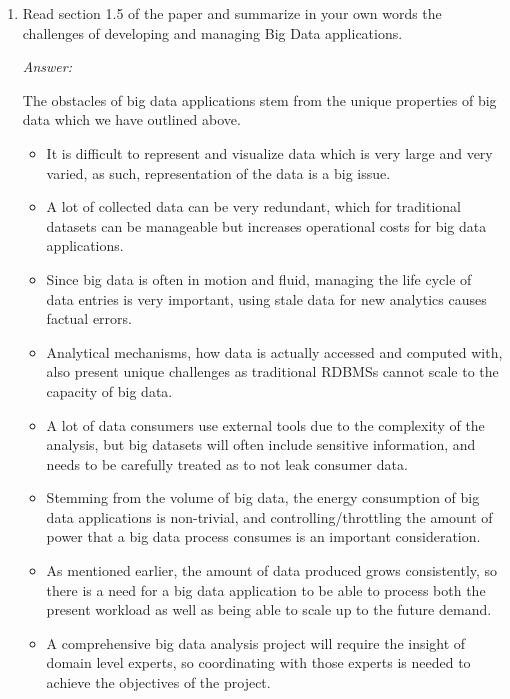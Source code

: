 \documentclass[11pt]{article}
\newcommand{\answer}{\vspace{0.25em}\par\textit{Answer:}\vspace{0.25em}\par}
\begin{document}
\begin{enumerate}
  \item Read section 1.5 of the paper and summarize in your own words
    the challenges of
    developing and managing Big Data applications.
    \answer
    The obstacles of big data applications stem from the
    unique properties of big data which we have outlined above.
    \begin{itemize}
      \item
        It is difficult to represent and visualize data which is very
        large and very varied, as such, representation of the data is a
        big issue.
      \item A lot of collected data can be very redundant, which
        for traditional datasets can be manageable but increases
        operational costs for big data applications.
      \item Since big
        data is often in motion and fluid, managing the life cycle of
        data entries is very important, using stale data for new
        analytics causes factual errors.
      \item Analytical mechanisms, how data
        is actually accessed and computed with, also present unique
        challenges as traditional RDBMSs cannot scale to the capacity
        of big data.
      \item A lot of data consumers use external tools due to the
        complexity of the analysis, but big datasets will often
        include sensitive information, and needs to be carefully
        treated as to not leak consumer data.
      \item Stemming from the volume of big data, the energy
        consumption of big data applications is non-trivial, and
        controlling/throttling the amount of power that a big data
        process consumes is an important consideration.
      \item As mentioned earlier, the amount of data produced grows
        consistently, so there is a need for a big data application
        to be able to process both the present workload as well as
        being able to scale up to the future demand.
      \item A comprehensive big data analysis project will require
        the insight of domain level experts, so coordinating with
        those experts is needed to achieve the objectives of the project.
    \end{itemize}
\end{enumerate}
\end{document}
